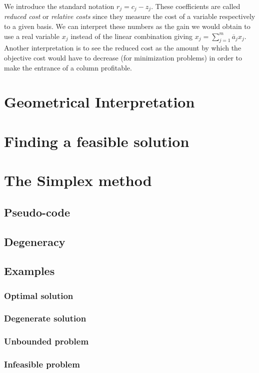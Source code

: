 We introduce the standard notation $r_j = c_j - z_j$. These coefficients are called \textit{reduced cost} or \textit{relative costs} since they measure the cost of a variable respectively to a given basis. We can interpret these numbers as the gain we would obtain to use a real variable $x_j$ instead of the linear combination giving $x_j = \sum_{j=1}^m \overline a_j x_j $. Another interpretation is to see the reduced cost as the amount by which the objective cost would have to decrease (for minimization problems) in order to make the entrance of a column profitable. 

\section{Geometrical Interpretation}

\section{Finding a feasible solution}

\section{The Simplex method}

\subsection{Pseudo-code}
\subsection{Degeneracy}
\subsection{Examples}
\subsubsection{Optimal solution}
\subsubsection{Degenerate solution}
\subsubsection{Unbounded problem}
\subsubsection{Infeasible problem}
